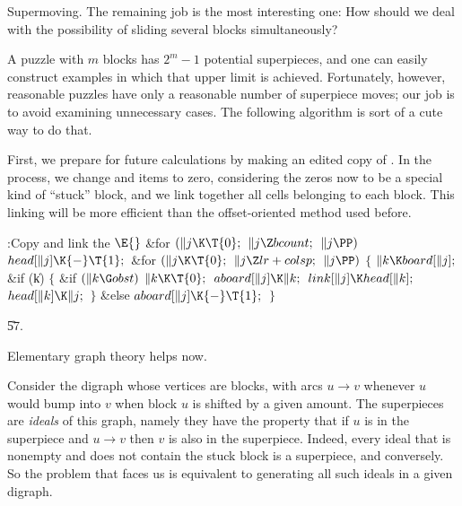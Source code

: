 Supermoving. The remaining job is the most interesting
one: How should we
deal with the possibility of sliding several blocks simultaneously?

A puzzle with $m$ blocks has $2^m-1$ potential superpieces,
and one can easily construct examples in which that upper limit is achieved.
Fortunately, however, reasonable puzzles have only a reasonable number of
superpiece moves; our job is to avoid examining unnecessary cases. The
following algorithm is sort of a cute way to do that.

First, we prepare for future calculations by making  an edited
copy of
. In the process, we change  and  items
to zero,
considering the zeros now to be a special kind of ``stuck'' block,
and we link together all cells belonging to each block.
This linking will be more efficient than the offset-oriented method
used before.

\Y\B\4:Copy and link the \X${}\E{}$\6
\&{for} ${}(\|j\K\T{0};{}$ ${}\|j\Z\\{bcount};{}$ ${}\|j\PP){}$\1\5
${}\\{head}[\|j]\K{-}\T{1};{}$\2\6
\&{for} ${}(\|j\K\T{0};{}$ ${}\|j\Z\\{lr}+\\{colsp};{}$ ${}\|j\PP){}$\5
${}\{{}$\1\6
${}\|k\K\\{board}[\|j];{}$\6
\&{if} (\|k)\5
${}\{{}$\1\6
\&{if} ${}(\|k\G\\{obst}){}$\1\5
${}\|k\K\T{0};{}$\2\6
${}\\{aboard}[\|j]\K\|k;{}$\6
${}\\{link}[\|j]\K\\{head}[\|k];{}$\6
${}\\{head}[\|k]\K\|j;{}$\6
\4${}\}{}$\5
\2\&{else}\1\5
${}\\{aboard}[\|j]\K{-}\T{1};{}$\2\6
\4${}\}{}$\2\par
\U57.\fi

Elementary graph theory helps now.

Consider the digraph whose vertices are blocks, with arcs $u\to v$
whenever $u$ would bump into $v$ when block $u$ is shifted by a given amount.
The superpieces are {\it ideals\/} of this graph, namely they have the
property that if $u$ is in the superpiece and $u\to v$ then $v$ is
also in the superpiece. Indeed, every ideal that is nonempty and does not
contain the stuck block is a superpiece, and conversely.
So the problem that faces us is equivalent to generating all such ideals
in a given digraph.

